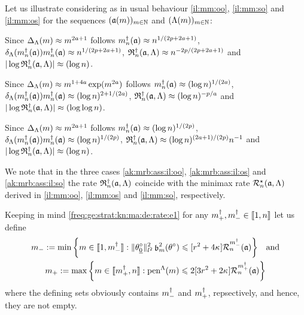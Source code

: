 \begin{il}\label{ak:mrb:ass:il}
Let us illustrate  considering as in  usual behaviour \ref{il:mm:oo}, \ref{il:mm:so} and \ref{il:mm:os} for the sequences $\Nsuite[\Di]{\xdfCw[(\Di)]}$ and $\Nsuite[\Di]{\iSv[\Di]}$:
  \begin{Liste}[]
  \item[\mylabel{ak:mrb:ass:il:oo}{\dg\bfseries{[o-o]}}] Since
   $\DipenSv\approx\Di^{2a+1}$
    follows $\aDi{\ssY}(\xdfCw[])\approx\ssY^{1/(2p+2a+1)}$,
    $\cmiSv[\aDi{\ssY}({\xdfCw[]})]\aDi{\ssY}(\xdfCw[])\approx\ssY^{1/(2p+2a+1)}$,
    $\naRa{(\xdfCw[],\Lambda)}\approx\ssY^{-2p/(2p+2a+1)}$ and $ \vert \log\naRa{(\xdfCw[],\Lambda)} \vert \approx(\log\ssY)$.
 \item[\mylabel{ak:mrb:ass:il:os}{\dg\bfseries{[o-s]}}]
    Since $\DipenSv\approx\Di^{1+4a}\exp(\Di^{2a})$ follows  $\aDi{\ssY}(\xdfCw[])\approx(\log\ssY)^{1/(2a)}$, $\cmiSv[\aDi{\ssY}({\xdfCw[]})]\aDi{\ssY}(\xdfCw[])\approx(\log\ssY)^{2+1/(2a)}$, 
    $\naRa{(\xdfCw[],\Lambda)}\approx(\log\ssY)^{-p/a}$ and $ \vert \log\naRa{(\xdfCw[],\Lambda)} \vert \approx(\log\log\ssY)$.
 \item[\mylabel{ak:mrb:ass:il:so}{\dg\bfseries{[s-o]}}]  Since
   $\DipenSv\approx\Di^{2a+1}$
    follows  $\aDi{\ssY}(\xdfCw[])\approx(\log\ssY)^{1/(2p)}$, $\cmiSv[\aDi{\ssY}({\xdfCw[]})]\aDi{\ssY}(\xdfCw[])\approx(\log\ssY)^{1/(2p)}$,
    $\naRa{(\xdfCw[],\Lambda)}\approx(\log\ssY)^{(2a+1)/(2p)}\ssY^{-1}$
    and     $ \vert \log\naRa{(\xdfCw[],\Lambda)} \vert \approx(\log\ssY)$.\ilEnd
  \end{Liste}
    We note that  in the three cases \ref{ak:mrb:ass:il:oo},
  \ref{ak:mrb:ass:il:os} and \ref{ak:mrb:ass:il:so} the rate
  $\naRa{(\xdfCw[],\Lambda)}$ coincide with the
  minimax rate $\mnRa{\xdfCw[],\Lambda}$ derived in  \ref{il:mm:oo},
  \ref{il:mm:os} and \ref{il:mm:so}, respectively.\ilEnd 
\end{il}
\begin{te}  
Keeping in mind \eqref{freq:ge:strat:kn:ma:de:rate:e1} for any $\pdDi,\mdDi\in\nset{1,\ssY}$ let us define 
\begin{multline}\label{freq:ge:strat:kn:ma:de:mDipDi}
\mDi:=\min\set{\Di\in\nset{1,\mdDi}: \Vnormlp{\xdf_{\underline{0}}}^2\bias[\Di]^2(\xdf)\leq
  [\xdfCr^2+4\cpen]\dRa{\mdDi}{\xdfCw[]}}\quad\text{and}\\\pDi:=\max\set{\Di\in\nset{\pdDi,\ssY}:
   \penSv \leq 2[3\xdfCr^2+ 2\cpen] \dRa{\pdDi}{\xdfCw[]}}
\end{multline}
where  the defining sets obviously contains $\mdDi$ and $\pdDi$, repsectively, and hence, they are
not empty.
\end{te}
